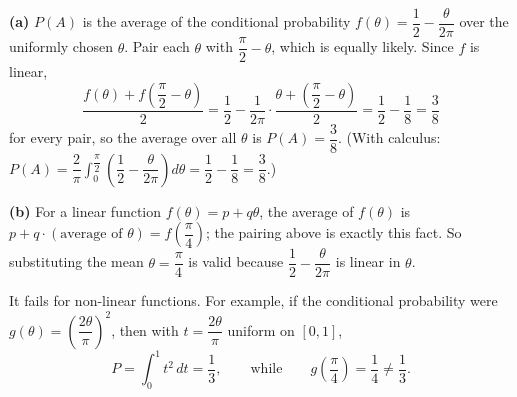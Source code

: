 \textbf{(a)} $P(A)$ is the average of the conditional probability $f(\theta)=\dfrac{1}{2}-\dfrac{\theta}{2\pi}$ over the uniformly chosen $\theta$. Pair each $\theta$ with $\dfrac{\pi}{2}-\theta$, which is equally likely. Since $f$ is linear,
\[
\dfrac{f(\theta)+f\left(\dfrac{\pi}{2}-\theta\right)}{2}=\dfrac{1}{2}-\dfrac{1}{2\pi}\cdot\dfrac{\theta+\left(\dfrac{\pi}{2}-\theta\right)}{2}=\dfrac{1}{2}-\dfrac{1}{8}=\dfrac{3}{8}
\]
for every pair, so the average over all $\theta$ is $P(A)=\boxed{\dfrac{3}{8}}$. (With calculus: $P(A)=\dfrac{2}{\pi}\displaystyle\int_0^{\dfrac{\pi}{2}}\left(\dfrac{1}{2}-\dfrac{\theta}{2\pi}\right)d\theta=\dfrac{1}{2}-\dfrac{1}{8}=\dfrac{3}{8}$.)

\textbf{(b)} For a linear function $f(\theta)=p+q\theta$, the average of $f(\theta)$ is $p+q\cdot(\text{average of }\theta)=f\left(\dfrac{\pi}{4}\right)$; the pairing above is exactly this fact. So substituting the mean $\theta=\dfrac{\pi}{4}$ is valid because $\dfrac{1}{2}-\dfrac{\theta}{2\pi}$ is linear in $\theta$.

It fails for non-linear functions. For example, if the conditional probability were $g(\theta)=\left(\dfrac{2\theta}{\pi}\right)^2$, then with $t=\dfrac{2\theta}{\pi}$ uniform on $[0,1]$,
\[
P=\int_0^1t^2\,dt=\dfrac{1}{3},\qquad\text{while}\qquad g\left(\dfrac{\pi}{4}\right)=\dfrac{1}{4}\ne\dfrac{1}{3} .
\]
